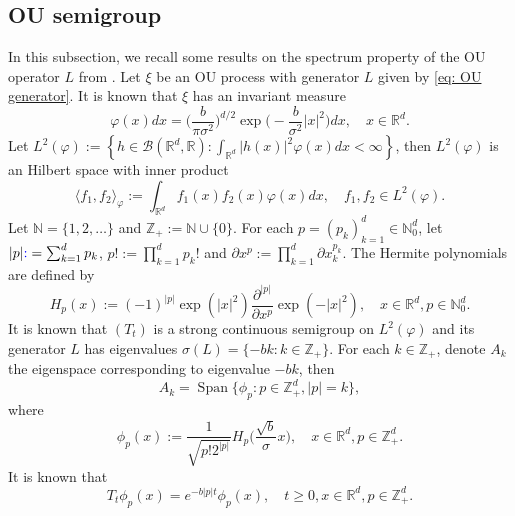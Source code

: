 \documentclass[12pt]{amsart}
\theoremstyle{plain}
\theoremstyle{definition}
\numberwithin{equation}{section}
\newcommand{\added}[1]{{\color{blue}#1}}\newcommand{\deleted}[1]{{\color{red}#1}}
\begin{document}
\subsection{OU semigroup}
    In this subsection, we recall some results on the spectrum property of the OU operator $L$ from \cite{GD}.
    Let $\xi$ be an OU process with generator $L$ given by \eqref{eq: OU generator}.
    It is known that $\xi$ has an invariant measure
\begin{equation}
\label{invariantdensity}
    \varphi(x)dx
    =\Big (\frac{b}{\pi \sigma^2}\Big )^{d/2}\exp \Big(-\frac{b}{\sigma^2}|x|^2 \Big)dx,
    \quad x\in \mathbb{R}^d.
\end{equation}
    Let $L^2(\varphi):= \left\{ h  \in \mathcal B(\mathbb R^d, \mathbb R): \int_{\mathbb{R}^d} |h(x)|^2 \varphi(x) dx < \infty \right\}$, then $L^2(\varphi)$ is an Hilbert space with inner product
\begin{equation}
    \langle f_1, f_2 \rangle_{\varphi}
    := \int_{\mathbb{R}^d}f_1(x)f_2(x)\varphi(x) dx, \quad f_1,f_2 \in L^2(\varphi).
\end{equation}
     Let $\mathbb N = \{1,2,\dots\}$ and $\mathbb Z_+ := \mathbb N\cup\{0\}$.
    For each $p = (p_k)_{k = 1}^d \in \mathbb{N}_0^{d}$, let $|p| \added{ :}=\sum_{k=1}^d p_k$, $p!:= \prod_{k= 1}^d p_k !$ and $\partial x^p:= \prod_{k = 1}^d\partial x_k^{p_k}$.
    The Hermite polynomials are defined by
\begin{equation}
    H_p(x)
    :=(-1)^{|p|}\exp(|x|^2) \frac{\partial ^{|p|}}{\partial x^p} \exp(-|x|^2) ,
    \quad x\in \mathbb R^d, p \in \mathbb{N}_0^{d}.
\end{equation}
    It is known that $(T_t)$ is a strong continuous semigroup on $L^2(\varphi)$ and its generator $L$ has eigenvalues $\sigma(L)= \{-bk: k \in \mathbb Z_+\}$.
    For each $k \in \mathbb Z_+$, denote $A_k$ the eigenspace corresponding to eigenvalue $-bk$, then
\begin{equation}
    A_k
    = \operatorname{Span} \{\phi_p : p\in \mathbb Z_+^d, |p|=k\},
\end{equation}
where
\begin{equation}\label{eigenfunction}
    \phi_p(x)
    := \frac{1}{\sqrt{ p! 2^{|p|} }} H_p \Big(\frac{ \sqrt{b} }{\sigma}x \Big),
    \quad x\in \mathbb{R}^d, p\in \mathbb Z_+^d.
\end{equation}
    It is known that
\begin{equation}\label{semigroupformula}
    T_t\phi_p(x)
    =e^{-b|p|t}\phi_p(x),
    \quad t\geq 0, x\in \mathbb{R}^d, p\in \mathbb Z_+^d.
\end{equation}
\end{document}
